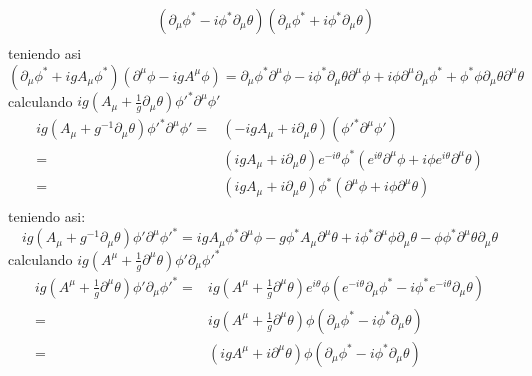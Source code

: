 \begin{itemize}
\begin{align*}
        &\left(\partial_\mu \phi^* - i\phi^* \partial_\mu \theta\right) \left(\partial_\mu \phi^* + i\phi^* \partial_\mu \theta\right)\\
    \end{align*}
    teniendo asi
    \begin{equation*}
        \left(\partial_\mu\phi^*+igA_\mu  \phi^*\right)\left(\partial^\mu \phi-igA^\mu \phi \right) = 
        \partial_\mu \phi^* \partial^\mu \phi 
        - i \phi^* \partial_\mu \theta \partial^\mu \phi 
        + i \phi \partial^\mu \partial_\mu \phi^* 
        + \phi^* \phi \partial_\mu \theta \partial^\mu \theta
    \end{equation*}
    calculando $ig \left(A_\mu+ \frac{1}{g}\partial_\mu \theta\right) {\phi}'^* \partial^\mu {\phi}'$
    \begin{align*}
        ig \left(A_\mu+ g^{-1}\partial_\mu \theta\right) {\phi}'^* \partial^\mu {\phi}' =& \left(-igA_\mu +i\partial_\mu \theta\right)\left( {\phi}'^* \partial^\mu {\phi}'\right)  \\
        =&\left( ig A_\mu   +i\partial_\mu \theta\right)e^{-i\theta} \phi^*\left( e^{i\theta} \partial^\mu \phi +i \phi e^{i\theta} \partial^\mu \theta\right)\\
        =&\left( ig A_\mu  +i\partial_\mu \theta\right)\phi^*\left( \partial^\mu \phi +i \phi  \partial^\mu \theta\right)\\
    \end{align*}
    teniendo asi:
    \begin{equation*}
        ig \left(A_\mu+ g^{-1}\partial_\mu \theta\right) {\phi}' \partial^\mu {\phi}'^*= 
        igA_\mu \phi^* \partial^\mu \phi
         - g\phi^* A_\mu \partial^\mu \theta
         + i \phi^* \partial^\mu \phi \partial_\mu \theta
         - \phi \phi^* \partial^\mu \theta \partial_\mu \theta
    \end{equation*}
    calculando $ig \left(A^\mu+ \frac{1}{g}\partial^\mu \theta\right) {\phi}' \partial_\mu {\phi}'^*$
    \begin{align*}
        ig \left(A^\mu+\frac{1}{g}\partial^\mu \theta\right) {\phi}' \partial_\mu {\phi}'^*=&ig \left(A^\mu+ \frac{1}{g}\partial^\mu \theta\right) e^{i\theta}{\phi} \left(e^{-i\theta}\partial_\mu \phi^* - i\phi^* e^{-i\theta} \partial_\mu \theta\right)\\
        =& ig \left(A^\mu+ \frac{1}{g}\partial^\mu \theta\right) {\phi} \left(\partial_\mu \phi^* - i \phi^* \partial_\mu \theta \right)\\
        =& \left(igA^\mu + i\partial^\mu \theta\right){\phi} \left(\partial_\mu \phi^* - i \phi^* \partial_\mu \theta \right)\\

\end{align*}
\end{itemize}
